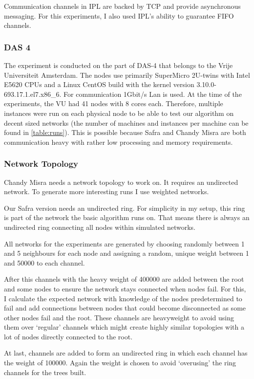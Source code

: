 Communication channels in IPL are backed by TCP and provide asynchronous messaging.
For this experiments, I also used IPL's ability to guarantee FIFO channels.

\subsubsection{DAS 4}
The experiment is conducted on the part of DAS-4 that belongs to the Vrije Universiteit Amsterdam. 
The nodes use primarily SuperMicro 2U-twins with Intel E5620 CPUs and a Linux CentOS build with the kernel version 3.10.0-693.17.1.el7.x86\_6.
For communication 1Gbit/s Lan is used.
At the time of the experiments, the VU had 41 nodes with 8 cores each.
Therefore, multiple instances were run on each physical node to be able to test our algorithm on decent sized networks (the number of machines and instances per machine can be found in \cref{table:runs}).
This is possible because Safra and Chandy Misra are both communication heavy with rather low processing and memory requirements.

\subsubsection{Network Topology}
Chandy Misra needs a network topology to work on. 
It requires an undirected network.
To generate more interesting runs I use weighted networks.

Our Safra version needs an undirected ring. 
For simplicity in my setup, this ring is part of the network the basic algorithm runs on. 
That means there is always an undirected ring connecting all nodes within simulated networks.

All networks for the experiments are generated by choosing randomly between 1 and 5 neighbours for each node and assigning a random, unique weight between 1 and 50000 to each channel.

After this channels with the heavy weight of 400000 are added between the root and some nodes to ensure the network stays connected when nodes fail.
For this, I calculate the expected network with knowledge of the nodes predetermined to fail and add connections between nodes that could become disconnected as some other nodes fail and the root.
These channels are heavyweight to avoid using them over `regular' channels which might create highly similar topologies with a lot of nodes directly connected to the root.

At last, channels are added to form an undirected ring in which each channel has the weight of 100000. 
Again the weight is chosen to avoid `overusing' the ring channels for the trees built.

